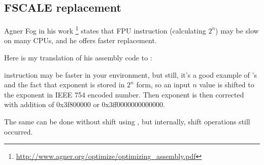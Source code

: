 \subsection{FSCALE replacement}

Agner Fog in his  work
\footnote{\url{http://www.agner.org/optimize/optimizing_assembly.pdf}} states that  \ac{FPU} instruction
(calculating $2^n$) may be slow on many CPUs, and he offers faster replacement.

Here is my translation of his assembly code to \CCpp:



 instruction may be faster in your environment, but still, it's a good example of 's and the fact
that exponent is stored in $2^n$ form,
so an input $n$ value is shifted to the exponent in IEEE 754 encoded number.
Then exponent is then corrected with addition of 0x3f800000 or 0x3ff0000000000000.

The same can be done without shift using , but internally, shift operations still occurred.

